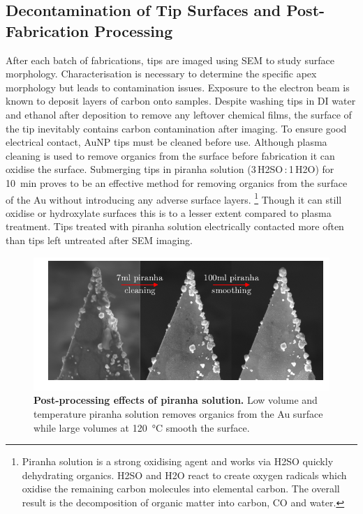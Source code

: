 \documentclass{article}
\begin{document}
\subsection{Decontamination of Tip Surfaces and Post-Fabrication Processing}

After each batch of fabrications, tips are imaged using SEM to study surface morphology. Characterisation is necessary to determine the specific apex morphology but leads to contamination issues. Exposure to the electron beam is known to deposit layers of carbon onto samples. Despite washing tips in DI water and ethanol after deposition to remove any leftover chemical films, the surface of the tip inevitably contains carbon contamination after imaging. To ensure good electrical contact, AuNP tips must be cleaned before use. Although plasma cleaning is used to remove organics from the surface before fabrication it can oxidise the surface. Submerging tips in piranha solution (3\,H\subs2SO\,:\,1\,H\subs2O) for \SI{10}{\minute} proves to be an effective method for removing organics from the surface of the Au without introducing any adverse surface layers.%
\footnote{Piranha solution is a strong oxidising agent and works via H\subs2SO quickly dehydrating organics. H\subs2SO and H\subs2O react to create oxygen radicals which oxidise the remaining carbon molecules into elemental carbon. The overall result is the decomposition of organic matter into carbon, CO and water.}
Though it can still oxidise or hydroxylate surfaces this is to a lesser extent compared to plasma treatment. Tips treated with piranha solution electrically contacted more often than tips left untreated after SEM imaging.

\begin{figure}[bt]
\centering
\includegraphics[clip=true, trim=20 20 0 0]{figures/tip_post_processing}
\caption[Post-processing effects of piranha solution.]{\textbf{Post-processing effects of piranha solution.} Low volume and temperature piranha solution removes organics from the Au surface while large volumes at \SI{120}{\celsius} smooth the surface.}
\label{fig:tip_post_processing}
\end{figure}
\end{document}
